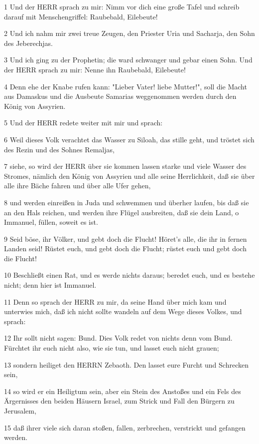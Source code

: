 \par 1 Und der HERR sprach zu mir: Nimm vor dich eine große Tafel und schreib darauf mit Menschengriffel: Raubebald, Eilebeute!
\par 2 Und ich nahm mir zwei treue Zeugen, den Priester Uria und Sacharja, den Sohn des Jeberechjas.
\par 3 Und ich ging zu der Prophetin; die ward schwanger und gebar einen Sohn. Und der HERR sprach zu mir: Nenne ihn Raubebald, Eilebeute!
\par 4 Denn ehe der Knabe rufen kann: "Lieber Vater! liebe Mutter!", soll die Macht aus Damaskus und die Ausbeute Samarias weggenommen werden durch den König von Assyrien.
\par 5 Und der HERR redete weiter mit mir und sprach:
\par 6 Weil dieses Volk verachtet das Wasser zu Siloah, das stille geht, und tröstet sich des Rezin und des Sohnes Remaljas,
\par 7 siehe, so wird der HERR über sie kommen lassen starke und viele Wasser des Stromes, nämlich den König von Assyrien und alle seine Herrlichkeit, daß sie über alle ihre Bäche fahren und über alle Ufer gehen,
\par 8 und werden einreißen in Juda und schwemmen und überher laufen, bis daß sie an den Hals reichen, und werden ihre Flügel ausbreiten, daß sie dein Land, o Immanuel, füllen, soweit es ist.
\par 9 Seid böse, ihr Völker, und gebt doch die Flucht! Höret's alle, die ihr in fernen Landen seid! Rüstet euch, und gebt doch die Flucht; rüstet euch und gebt doch die Flucht!
\par 10 Beschließt einen Rat, und es werde nichts daraus; beredet euch, und es bestehe nicht; denn hier ist Immanuel.
\par 11 Denn so sprach der HERR zu mir, da seine Hand über mich kam und unterwies mich, daß ich nicht sollte wandeln auf dem Wege dieses Volkes, und sprach:
\par 12 Ihr sollt nicht sagen: Bund. Dies Volk redet von nichts denn vom Bund. Fürchtet ihr euch nicht also, wie sie tun, und lasset euch nicht grauen;
\par 13 sondern heiliget den HERRN Zebaoth. Den lasset eure Furcht und Schrecken sein,
\par 14 so wird er ein Heiligtum sein, aber ein Stein des Anstoßes und ein Fels des Ärgernisses den beiden Häusern Israel, zum Strick und Fall den Bürgern zu Jerusalem,
\par 15 daß ihrer viele sich daran stoßen, fallen, zerbrechen, verstrickt und gefangen werden.
